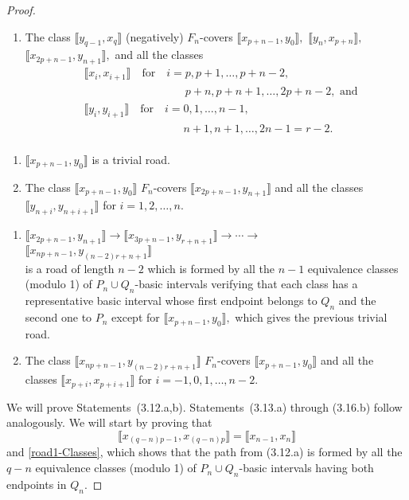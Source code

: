 \documentclass[a4paper, 11pt]{amsart}
\numberwithin{equation}{section}
\theoremstyle{customnumberedtheorem}
\theoremstyle{definitionwithbfnote}
\newcommand{\bigBIclass}[1]{\ensuremath{\bigl\llbracket #1\bigr\rrbracket}}
\newcommand{\andq}[1][and]{\ensuremath{\quad\text{#1}\quad}}
\begin{document}
\begin{proof}
\begin{enumerate}
\item The class $\bigBIclass{y_{q-1},x_q}$ (negatively) $F_n$-covers
  $\bigBIclass{x_{p+n-1},y_0},$ $\bigBIclass{y_n,x_{p+n}},$
  $\bigBIclass{x_{2p+n-1},y_{n+1}},$
  and all the classes
  \begin{align*}
   & \bigBIclass{x_{i},x_{i+1}} \andq[for] i=p,p+1,\dots, p+n-2,\\
   & \phantom{\bigBIclass{x_{i},x_{i+1}} \andq[for] i=}p+n,p+n+1,\dots,2p+n-2,\text{ and}\\
   & \bigBIclass{y_{i},y_{i+1}} \andq[for] i=0,1,\dots, n-1,\\
   & \phantom{\bigBIclass{y_{i},y_{i+1}} \andq[for] i=}n+1,n+1,\dots,2n-1=r-2.
  \end{align*}
\end{enumerate}
\begin{enumerate}
\item $\bigBIclass{x_{p+n-1},y_0}$ is a trivial road.

\item The class $\bigBIclass{x_{p+n-1},y_0}$ $F_n$-covers
  $\bigBIclass{x_{2p+n-1},y_{n+1}}$
  and all the classes
  $\bigBIclass{y_{n+i},y_{n+i+1}}$ for $i=1,2,\dots, n.$
\end{enumerate}
\begin{enumerate}
\item $
  \bigBIclass{x_{2p+n-1},y_{n+1}} \longrightarrow
  \bigBIclass{x_{3p+n-1},y_{r+n+1}} \longrightarrow\cdots \longrightarrow$\\
  \hspace*{\fill}$\bigBIclass{x_{np+n-1},y_{(n-2)r+n+1}}
$\\[\smallskipamount]
is a road of length $n-2$ which is formed by all the $n-1$ equivalence
classes (modulo 1) of $P_n \cup Q_n$-basic intervals
verifying that  each class has a representative basic interval
whose first endpoint belongs to $Q_n$ and the second one to $P_n$
except for $\bigBIclass{x_{p+n-1},y_0},$ which gives the previous trivial
road.

\item The class $\bigBIclass{x_{np+n-1},y_{(n-2)r+n+1}}$ $F_n$-covers
  $\bigBIclass{x_{p+n-1},y_0}$
  and all the classes
  $\bigBIclass{x_{p+i},x_{p+i+1}}$ for $i=-1,0,1,\dots, n-2.$
\end{enumerate}

We will prove Statements~(3.12.a,b).
Statements~(3.13.a) through (3.16.b) follow analogously.
We will start by proving that
\[ \bigBIclass{x_{(q-n)p-1},x_{(q-n)p}} = \bigBIclass{x_{n-1},x_{n}} \]
and \eqref{road1-Classes},
which shows that the path from (3.12.a) is formed
by all the $q-n$ equivalence classes (modulo 1) of
$P_n \cup Q_n$-basic intervals having both endpoints in $Q_n.$


\end{proof}
\end{document}
